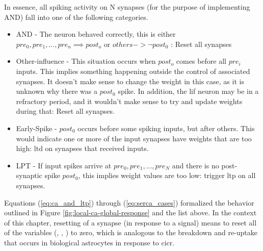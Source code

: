 


In essence, all spiking activity on N synapses (for the purpose of implementing
AND) fall into one of the following categories.
\begin{itemize}
\item AND - The neuron behaved correctly, this is either $pre_0, pre_1, ...,
  pre_n \implies post_o$ or $others -> \neg post_0$ : Reset all synapses
\item Other-influence - This situation occurs when $post_o$ comes before all
  $pre_i$ inputs. This implies something happening outside the control of
  associated synapses. It doesn't make sense to change the weight in this case,
  as it is unknown why there was a $post_0$ spike. In addition, the \gls{lif} neuron
  may be in a refractory period, and it wouldn't make sense to try and update
  weights during that: Reset all synapses.
\item Early-Spike - $post_0$ occurs before some spiking inputs, but after
  others. This would indicate one or more of the input synapses have weights
  that are too high: \gls{ltd} on synapses that received inputs.
\item LPT - If input spikes arrive at $pre_0, pre_1, ..., pre_N$ and there is no
  post-synaptic spike $post_0$, this implies weight values are too low: trigger
  \gls{ltp} on all synapses.
\end{itemize}

Equations (\ref{eq:ca_and_ltp}) through (\ref{eq:serca_cases}) formalized the behavior outlined
in Figure \ref{fig:local-ca-global-response} and the list above. In the context
of this chapter, resetting of a synapse (in response to a \serca signal) means
to reset all of the variables (\ca, \ipt, \kp) to zero, which is analogous to
the breakdown and re-uptake that occurs in biological astrocytes in response to
\gls{cicr}.

